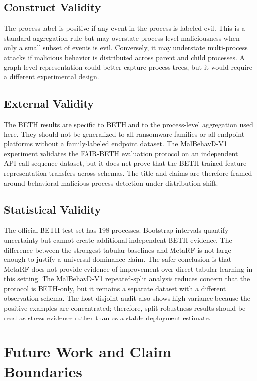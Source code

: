 \documentclass[journal]{IEEEtran}
\begin{document}
\subsection{Construct Validity}

The process label is positive if any event in the process is labeled evil. This is a standard aggregation rule but may overstate process-level maliciousness when only a small subset of events is evil. Conversely, it may understate multi-process attacks if malicious behavior is distributed across parent and child processes. A graph-level representation could better capture process trees, but it would require a different experimental design.

\subsection{External Validity}

The BETH results are specific to BETH and to the process-level aggregation used here. They should not be generalized to all ransomware families or all endpoint platforms without a family-labeled endpoint dataset. The MalBehavD-V1 experiment validates the FAIR-BETH evaluation protocol on an independent API-call sequence dataset, but it does not prove that the BETH-trained feature representation transfers across schemas. The title and claims are therefore framed around behavioral malicious-process detection under distribution shift.

\subsection{Statistical Validity}

The official BETH test set has 198 processes. Bootstrap intervals quantify uncertainty but cannot create additional independent BETH evidence. The difference between the strongest tabular baselines and MetaRF is not large enough to justify a universal dominance claim. The safer conclusion is that MetaRF does not provide evidence of improvement over direct tabular learning in this setting. The MalBehavD-V1 repeated-split analysis reduces concern that the protocol is BETH-only, but it remains a separate dataset with a different observation schema. The host-disjoint audit also shows high variance because the positive examples are concentrated; therefore, split-robustness results should be read as stress evidence rather than as a stable deployment estimate.

\section{Future Work and Claim Boundaries}
\label{sec:recommendations}
\end{document}
